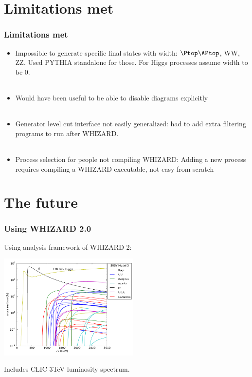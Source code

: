 \documentclass{beamer}
\newcommand{\whizard}{WHIZARD\xspace}
\begin{document}
\section{Limitations met}
\begin{frame}
\frametitle{Limitations met}
\begin{itemize}
  \item Impossible to generate specific final states with width: $\Ptop\APtop$,
  WW, ZZ. {\color{blue}Used PYTHIA standalone} for those. For Higgs processes
  assume width to be 0.\\
  ~\\
  \item Would have been useful to be able to {\color{blue}disable diagrams
  explicitly}\\
  ~\\
  \item Generator level cut interface not easily generalized: had to
  {\color{blue}add extra filtering programs} to run after \whizard.\\
  ~\\
  \item Process selection for people not compiling \whizard: Adding a
  {\color{blue}new process requires compiling a \whizard executable}, not easy
  from scratch
\end{itemize}
\end{frame}
\section{The future}
\begin{frame}
\frametitle{Using \whizard 2.0}
Using analysis framework of \whizard2:
\begin{center}
\includegraphics[width=7cm]{./model3.pdf}
\end{center}
Includes CLIC 3TeV luminosity spectrum.
\end{frame}
\end{document}
